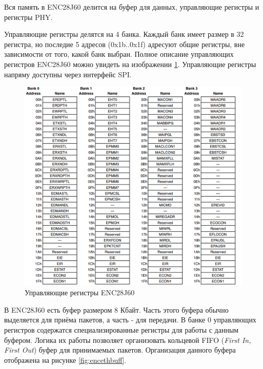 Вся память в ENC28J60 делится на буфер для данных, управляющие регистры и регистры PHY.

Управляющие регистры делятся на 4 банка. Каждый банк имеет размер в 32 регистра, но последие 5 адресов (0x1b..0x1f) адресуют общие регистры, вне зависимости от того, какой банк выбран. Полное описание управляющих регистров ENC28J60 можно увидеть на изображении \ref{fig:encregmap}. Управляющие регистры напряму доступны через интерфейс SPI. 

\begin{figure}[H]
	\centering
		\includegraphics[scale=0.45]{img/encregmap.png}
	\caption{Управляющие регистры ENC28J60\label{fig:encregmap} \cite{enc28j60datasheet}}
\end{figure}

В ENC28J60 есть буфер размером 8 Кбайт. Часть этого буфера обычно выделяется для приёма пакетов, а часть - для передачи. В банке 0 управляющих регистров содержатся специализированные регистры для работы с данным буфером. Логика их работы позволяет организовать кольцевой FIFO (\textit{First In, First Out}) буфер для принимаемых пакетов. Организация данного буфера отображена на рисунке \ref{fig:encethbuff}.

